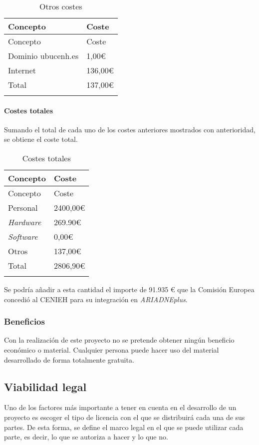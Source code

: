 \begin{longtable}[]{@{}ll@{}}
\toprule
Concepto & Coste\tabularnewline
\midrule
\endfirsthead
\toprule
Concepto & Coste\tabularnewline
\midrule
\endhead
Dominio ubucenh.es & 1,00\euro{}\tabularnewline
Internet & 136,00\euro{}\tabularnewline
Total & 137,00\euro{}\tabularnewline
\bottomrule
\caption{Otros costes}\tabularnewline
\end{longtable}

\paragraph{Costes totales}

Sumando el total de cada uno de los costes anteriores mostrados con
anterioridad, se obtiene el coste total.

\begin{longtable}[]{@{}ll@{}}
\toprule
Concepto & Coste\tabularnewline
\midrule
\endfirsthead
\toprule
Concepto & Coste\tabularnewline
\midrule
\endhead
Personal & 2400,00\euro{}\tabularnewline
\emph{Hardware} & 269.90\euro{}\tabularnewline
\emph{Software} & 0,00\euro{}\tabularnewline
Otros & 137,00\euro{}\tabularnewline
Total & 2806,90\euro{}\tabularnewline
\bottomrule
\caption{Costes totales}\tabularnewline
\end{longtable}

Se podría añadir a esta cantidad el importe de 91.935 \euro{} que la Comisión
Europea concedió al CENIEH para su integración en \emph{ARIADNEplus}.

\subsubsection{Beneficios}

Con la realización de este proyecto no se pretende obtener ningún
beneficio económico o material. Cualquier persona puede hacer uso del
material desarrollado de forma totalmente gratuita.

\subsection{Viabilidad legal}

Uno de los factores más importante a tener en cuenta en el desarrollo de
un proyecto es escoger el tipo de licencia con el que se distribuirá
cada una de sus partes. De esta forma, se define el marco legal en el
que se puede utilizar cada parte, es decir, lo que se autoriza a hacer y
lo que no.

